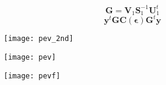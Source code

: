 \documentclass{beamer}
\begin{document}
\begin{frame}
\begin{figure}
\end{figure}
\end{frame}


\begin{frame}
\begin{equation*}
\textbf{G} = \textbf{V}_1\textbf{S}^{-1}_1\textbf{U}^t_1
\end{equation*}
\begin{equation*}
 \mathbf{y}^{t} \mathbf{GC}(\boldsymbol{\epsilon})\mathbf{G}^{t} \mathbf{y}
\end{equation*}
\begin{figure}
\vspace{-0.25cm} \texttt{[image: pev\_2nd]}
\end{figure}
\end{frame}

\begin{frame}
\begin{figure}
\end{figure}
\end{frame}



\begin{frame}
\begin{figure}
\vspace{-0.25cm} \texttt{[image: pev]}
\end{figure}
\end{frame}

\begin{frame}
\begin{figure}
\vspace{-0.25cm} \texttt{[image: pevf]}
\end{figure}
\end{frame}


\end{document}
